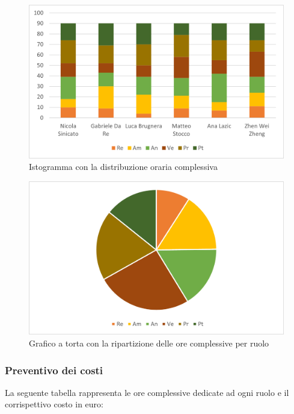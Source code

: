 \begin{figure}[H]
    \centering
    \includegraphics[scale=0.6]{img/grafi preventivo/istogrammi/totale/totale.png}
    \caption{Istogramma con la distribuzione oraria complessiva}
\end{figure}
\begin{figure}[H]
    \centering
    \includegraphics[scale=0.6]{img/grafi preventivo/torta/totale/totale.png}
    \caption{Grafico a torta con la ripartizione delle ore complessive per ruolo}
\end{figure}
\subsubsection{Preventivo dei costi}
La seguente tabella rappresenta le ore complessive dedicate ad ogni ruolo e il corrispettivo costo in euro:

